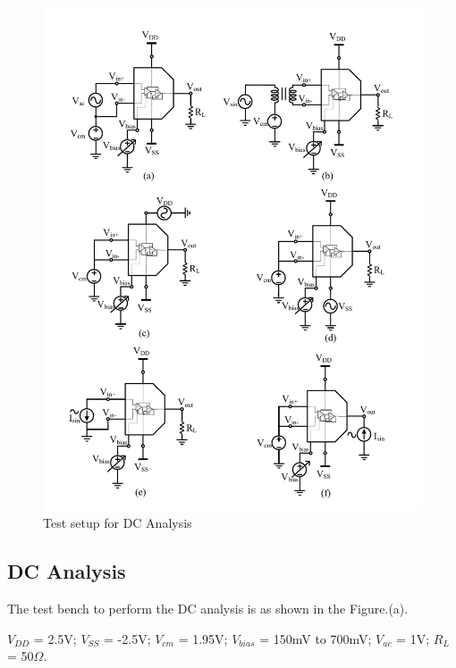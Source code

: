 \begin{figure} [H]
\centering
\includegraphics[scale=0.9]{Figures/Test_Benches/Overall_TB.pdf}
\caption{Test setup for DC Analysis}
\label{fig:TB}
\end{figure}

\subsection{DC Analysis}
The test bench to perform the DC analysis is as shown in the Figure.(a). 

$V_{DD}$ = 2.5V; $V_{SS}$ = -2.5V; $V_{cm}$ = 1.95V; $V_{bias}$ = 150mV to 700mV;  $V_{ac}$ = 1V; $R_{L}$ = 50$\Omega$.

